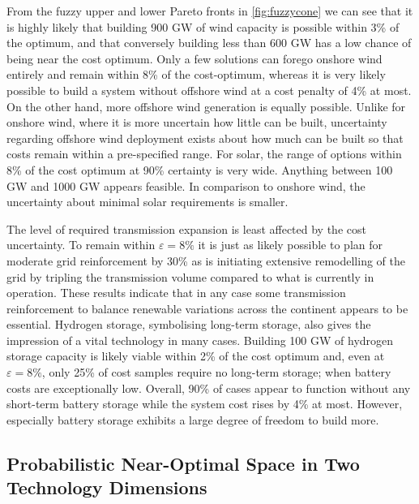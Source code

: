 From the fuzzy upper and lower Pareto fronts in \cref{fig:fuzzycone} we can see that it is 
highly likely that building 900 GW of wind capacity is possible within 3\% of the optimum, and that
conversely building less than 600 GW has a low chance of being near the cost optimum.
Only a few solutions can forego onshore wind entirely and remain within 8\% of the cost-optimum,
whereas it is very likely possible to build a system without offshore wind at a cost penalty of 4\% at most.
On the other hand, more offshore wind generation is equally possible.
Unlike for onshore wind, where it is more uncertain how little can be built,
uncertainty regarding offshore wind deployment exists about how much can be built
so that costs remain within a pre-specified range.
For solar, the range of options within 8\% of the cost optimum at 90\% certainty is very wide.
Anything between 100 GW and 1000 GW appears feasible.
In comparison to onshore wind, the uncertainty about minimal solar requirements is smaller.

The level of required transmission expansion is least affected by the cost uncertainty.
To remain within $\varepsilon=8\%$ it is just as likely possible to
plan for moderate grid reinforcement by 30\% as 
is initiating extensive remodelling of the grid by tripling the transmission volume
compared to what is currently in operation.
These results indicate that in any case some transmission reinforcement
to balance renewable variations across the continent appears to be essential.
Hydrogen storage, symbolising long-term storage, also gives the impression of a vital technology in many cases.
Building 100 GW of hydrogen storage capacity is likely viable within 2\% of the cost optimum 
and, even at $\varepsilon=8\%$, only 25\% of cost samples require no long-term storage; 
when battery costs are exceptionally low.
Overall, 90\% of cases appear to function without any short-term battery storage
while the system cost rises by 4\% at most.
However, especially battery storage exhibits a large degree of freedom to build more.

\subsection{Probabilistic Near-Optimal Space in Two Technology Dimensions}

